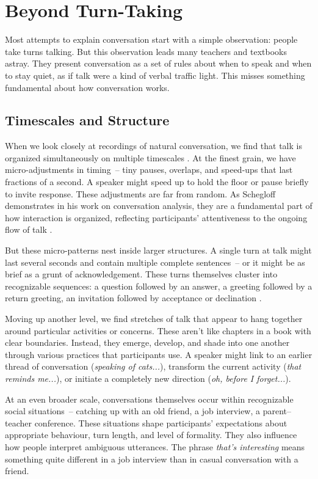 \section{Beyond Turn-Taking} \label{sec:beyond-turns}

Most attempts to explain conversation start with a simple observation: people take turns talking. But this observation leads many teachers and textbooks astray. They present conversation as a set of rules about when to speak and when to stay quiet, as if talk were a kind of verbal traffic light. This misses something fundamental about how conversation works.

\subsection{Timescales and Structure} \label{subsec:timescales}

When we look closely at recordings of natural conversation, we find that talk is organized simultaneously on multiple timescales \citep{Schegloff1977,Fauviaux2023}. At the finest grain, we have micro-adjustments in timing~-- tiny pauses, overlaps, and speed-ups that last fractions of a second. A speaker might speed up to hold the floor or pause briefly to invite response. These adjustments are far from random. As Schegloff demonstrates in his work on conversation analysis, they are a fundamental part of how interaction is organized, reflecting participants' attentiveness to the ongoing flow of talk \citep{Schegloff1982}.

But these micro-patterns nest inside larger structures. A single turn at talk might last several seconds and contain multiple complete sentences~-- or it might be as brief as a grunt of acknowledgement. These turns themselves cluster into recognizable sequences: a question followed by an answer, a greeting followed by a return greeting, an invitation followed by acceptance or declination \citep{Sacks1973}.

Moving up another level, we find stretches of talk that appear to hang together around particular activities or concerns. These aren't like chapters in a book with clear boundaries. Instead, they emerge, develop, and shade into one another through various practices that participants use. A speaker might link to an earlier thread of conversation (\textit{speaking of cats...}), transform the current activity (\textit{that reminds me...}), or initiate a completely new direction (\textit{oh, before I forget...}).

At an even broader scale, conversations themselves occur within recognizable social situations~-- catching up with an old friend, a job interview, a parent--teacher conference. These situations shape participants' expectations about appropriate behaviour, turn length, and level of formality. They also influence how people interpret ambiguous utterances. The phrase \textit{that's interesting} means something quite different in a job interview than in casual conversation with a friend.


